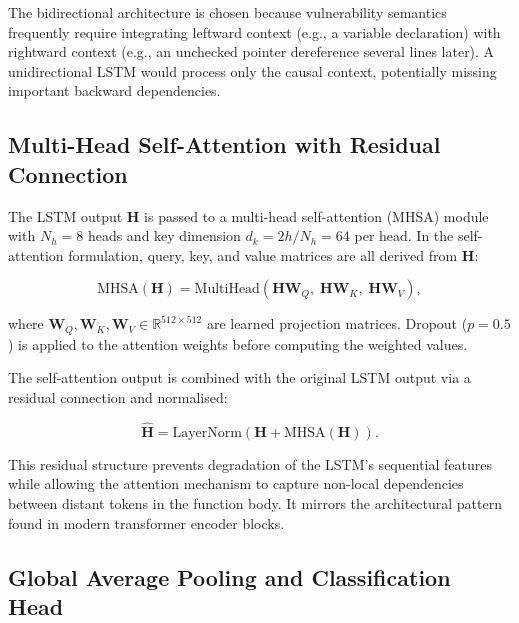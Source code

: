 The bidirectional architecture is chosen because vulnerability semantics
frequently require integrating leftward context (e.g., a variable
declaration) with rightward context (e.g., an unchecked pointer dereference
several lines later).
A unidirectional LSTM would process only the causal context, potentially
missing important backward dependencies.

\subsection{Multi-Head Self-Attention with Residual Connection}
\label{sec:attention}

The LSTM output $\mathbf{H}$ is passed to a multi-head self-attention
(MHSA) module~\cite{attention_is_all_you_need} with $N_h = 8$ heads and key
dimension $d_k = 2h / N_h = 64$ per head.
In the self-attention formulation, query, key, and value matrices are all
derived from $\mathbf{H}$:

\begin{equation}
  \text{MHSA}(\mathbf{H}) =
    \text{MultiHead}(\mathbf{H}\mathbf{W}_Q,\; \mathbf{H}\mathbf{W}_K,\;
                     \mathbf{H}\mathbf{W}_V),
  \label{eq:mhsa}
\end{equation}

\noindent where $\mathbf{W}_Q, \mathbf{W}_K, \mathbf{W}_V \in
\mathbb{R}^{512 \times 512}$ are learned projection matrices.
Dropout ($p = 0.5$) is applied to the attention weights before computing the
weighted values.

The self-attention output is combined with the original LSTM output via a
residual connection and normalised:

\begin{equation}
  \hat{\mathbf{H}} = \text{LayerNorm}\!\left(
    \mathbf{H} + \text{MHSA}(\mathbf{H})
  \right).
  \label{eq:residual}
\end{equation}

\noindent
This residual structure prevents degradation of the LSTM's sequential
features while allowing the attention mechanism to capture non-local
dependencies between distant tokens in the function body.
It mirrors the architectural pattern found in modern transformer encoder
blocks.

\subsection{Global Average Pooling and Classification Head}
\label{sec:head}

